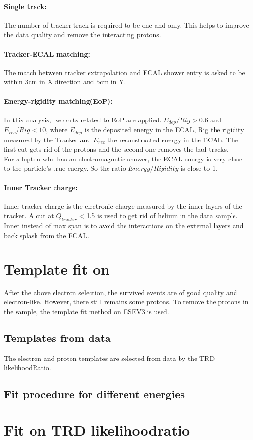 \paragraph{Single track:} The number of tracker track is required to be one and only. This helps to improve the data quality and remove the interacting protons.
\paragraph{Tracker-ECAL matching:} The match between tracker extrapolation and ECAL shower entry is asked to be within 3cm in X direction and 5cm in Y.
\paragraph{Energy-rigidity matching(EoP):} In this analysis, two cuts related to EoP are applied: $E_{dep}/Rig>0.6$ and $E_{rec}/Rig<10$, where $E_{dep}$ is the deposited energy in the ECAL, Rig the rigidity measured by the Tracker and $E_{rec}$ the reconstructed energy in the ECAL. The first cut gets rid of the protons and the second one removes the bad tracks.\\
For a lepton who has an electromagnetic shower, the ECAL energy is very close to the particle's true energy. So the ratio $Energy/Rigidity$ is close to 1.
\paragraph{Inner Tracker charge:} Inner tracker charge is the electronic charge measured by the inner layers of the tracker. A cut at $Q_{tracker}<$1.5 is used to get rid of helium in the data sample. Inner instead of max span is to avoid the interactions on the external layers and back splash from the ECAL.\\

\section{Template fit on \ESE}
After the above electron selection, the survived events are of good quality and electron-like. However, there still remains some protons. To remove the protons in the sample, the template fit method on ESEV3 is used.
\subsection{Templates from data}
The electron and proton templates are selected from data by the TRD likelihoodRatio.
\subsection{Fit procedure for different energies}

\section{Fit on TRD likelihoodratio}
